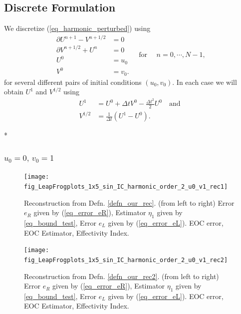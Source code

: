 \documentclass[12pt,a4paper]{article}
\numberwithin{equation}{section}
\theoremstyle{definition}
\newcommand{\qp}[1]{\left(#1\right)}
\begin{document}
\subsection{Discrete Formulation}\label{subsec_disc_form}
We discretize (\ref{eq_harmonic_perturbed}) using
\begin{equation}
\begin{aligned}
\partial U^{n+1} - V^{n+1/2} &= 0\\
\partial V^{n+1/2} +U^n &= 0\\
U^0 & =u_0\\
V^0 &=v_0.
\end{aligned}
\quad \text{for } \quad n= 0,\cdots, N-1,
\end{equation}
for several different pairs of initial conditions $\qp{u_0, v_0}$.  In each case we will obtain  $U^1$ and $V^{1/2}$ using
\begin{equation}
\begin{aligned}
U^1&=U^0+\Delta t V^0 -\frac{\Delta t^2}{2}U^0\quad\text{and}\\
V^{1/2} &= \frac{1}{\Delta t}\qp{U^1-U^0}.
\end{aligned}
\end{equation}


\/*
\subsubsection{$u_0=0,\, v_0=1$}
\begin{figure}[H]
	\hspace{-3cm}
	\texttt{[image: fig\_LeapFrogplots\_1x5\_sin\_IC\_harmonic\_order\_2\_u0\_v1\_rec1]}	
	\caption{Reconstruction from Defn. \ref{defn_our_rec}. (from left to right) Error $e_R$ given by (\ref{eq_error_eR}), Estimator $\eta_1$ given by \ref{eq_bound_test}, Error $e_L$ given by  (\ref{eq_error_eL}). EOC error, EOC Estimator, Effectivity Index.}
	\label{fig_all_in_one_our_rec_1_u0_v1}
\end{figure}

\begin{figure}[H]
	\hspace{-3cm}
	\texttt{[image: fig\_LeapFrogplots\_1x5\_sin\_IC\_harmonic\_order\_2\_u0\_v1\_rec2]}	
	\caption{Reconstruction from Defn. \ref{defn_our_rec2}. (from left to right) Error $e_R$ given by (\ref{eq_error_eR}), Estimator $\eta_1$ given by \ref{eq_bound_test}, Error $e_L$ given by  (\ref{eq_error_eL}). EOC error, EOC Estimator, Effectivity Index.}
	\label{fig_all_in_one_our_rec_2_u0_v1}
\end{figure}
\end{document}
